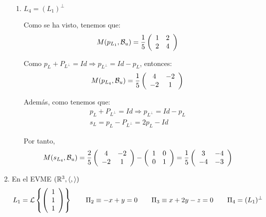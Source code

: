 \begin{ejercicio}
\begin{enumerate}
\begin{enumerate}
        \item $L_4=(L_1)^\perp$

        Como se ha visto, tenemos que:
        \begin{equation*}
            M(p_{L_1},\mathcal{B}_u) = \frac{1}{5}\left(\begin{array}{cc}
                1 & 2 \\
                2 & 4
            \end{array}\right)
        \end{equation*}

        Como $p_L +P_{L^\perp} = Id \Longrightarrow p_{L^\perp} = Id -p_L$, entonces:
        \begin{equation*}
            M(p_{L_4},\mathcal{B}_u) = \frac{1}{5}\left(\begin{array}{cc}
                4 & -2 \\
                -2 & 1
            \end{array}\right)
        \end{equation*}

        Además, como tenemos que:
        \begin{gather*}
            p_L +P_{L^\perp} = Id \Longrightarrow p_{L^\perp} = Id -p_L\\
            s_L = p_L - P_{L^\perp} = 2p_L -Id
        \end{gather*}

        Por tanto,
        \begin{equation*}
            M(s_{L_4},\mathcal{B}_u) = \frac{2}{5}\left(\begin{array}{cc}
                4 & -2 \\
                -2 & 1
            \end{array}\right) - \left(\begin{array}{cc}
                1 & 0 \\
                0 & 1
            \end{array}\right)
            = \frac{1}{5}\left(\begin{array}{cc}
                3 & -4 \\
                -4 & -3
            \end{array}\right)
        \end{equation*}
    \end{enumerate}

        


    \item En el EVME $(\mathbb{R}^3,\langle,\rangle)$ \label{Ej1.2}
    \begin{equation*}
        L_1=\mathcal{L}\left\{\left(\begin{array}{c}
             1 \\ 1 \\ 1
        \end{array}\right)\right\}
        \qquad
        \Pi_2\equiv -x+y=0
        \qquad
        \Pi_3 \equiv x+2y-z=0
        \qquad
        \Pi_4=(L_1)^\perp
    \end{equation*}


\end{enumerate}
\end{ejercicio}
